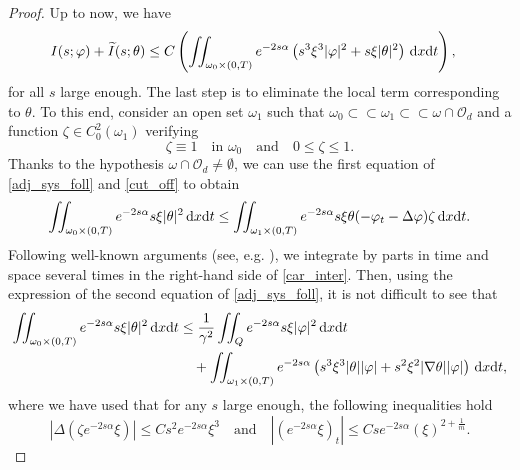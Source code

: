 \documentclass{aims}
\theoremstyle{definition}
\def\dx{\,\textnormal{d}x}
\def\dt{\textnormal{d}t}
\begin{document}
\begin{proof}
Up to now, we have 
%
\begin{equation}\label{est_locales}
\begin{split}
I(s;\varphi)+\widetilde{I}(s;\theta)\leq C&\left(\iint_{\omega_0\times(0,T)}e^{-2s\alpha}\left(s^3\xi^3|\varphi|^2+s\xi|\theta|^2\right)\dx\dt \right),
\end{split}
\end{equation}
%
for all $s$ large enough. The last step is to eliminate the local term corresponding to $\theta$. To this end, consider an open set $\omega_1$ such that $\omega_0\subset\subset\omega_1\subset \subset \omega\cap \mathcal O_d$ and a function $\zeta\in C_0^2(\omega_1)$ verifying 
%
\begin{equation}\label{cut_off}
\zeta\equiv 1\quad \text{in } \omega_0 \quad \text{and} \quad 0\leq \zeta\leq 1. 
\end{equation}
%
Thanks to the hypothesis $\omega\cap\mathcal O_d\neq \emptyset$, we can use the first equation of \eqref{adj_sys_foll} and \eqref{cut_off} to obtain
%
\begin{equation}\label{car_inter}
\iint_{\omega_0\times(0,T)}e^{-2s\alpha}s\xi|\theta|^2\dx\dt\leq \iint_{\omega_1\times(0,T)}e^{-2s\alpha}s\xi \theta(-\varphi_t-\Delta \varphi)\zeta\dx\dt.
\end{equation}
%
Following well-known arguments (see, e.g. \cite{luz_manuel,deteresa2000}), we integrate by parts in time and space several times in the right-hand side of \eqref{car_inter}. Then, using the expression of the second equation of \eqref{adj_sys_foll}, it is not difficult to see that 
%
\begin{equation}\label{inter_res}
\begin{split}
\iint_{\omega_0\times(0,T)}e^{-2s\alpha}s\xi|\theta|^2\dx\dt&\leq \frac{1}{\gamma^2}\iint_{Q}e^{-2s\alpha}s\xi |\varphi|^2\dx\dt\\
&\quad+\iint_{\omega_1\times(0,T)}e^{-2s\alpha}\left(s^3\xi^3|\theta| |\varphi|+s^2\xi^2|\nabla \theta||\varphi|\right)\dx\dt,
\end{split}
\end{equation}
%
where we have used that for any $s$ large enough, the following inequalities hold
%
\begin{equation*}
|\Delta(\zeta e^{-2s\alpha}\xi)|\leq Cs^2e^{-2s\alpha}\xi^3 \quad \text{and}\quad |(e^{-2s\alpha}\xi)_t|\leq Cse^{-2s\alpha}(\xi)^{2+\frac{1}{m}}.
\end{equation*}
%


\end{proof}
\end{document}
